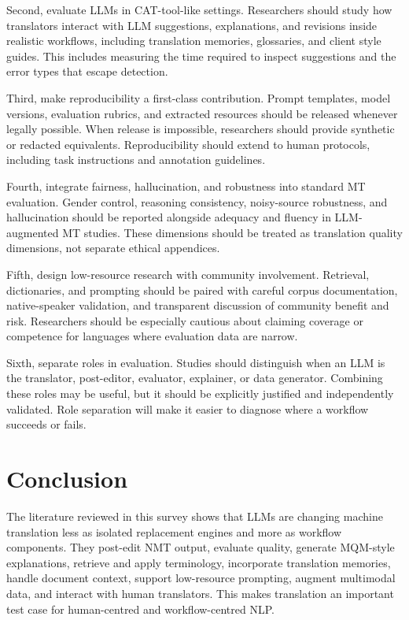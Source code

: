\documentclass[11pt]{article}
\begin{document}
Second, evaluate LLMs in CAT-tool-like settings. Researchers should study how translators interact with LLM suggestions, explanations, and revisions inside realistic workflows, including translation memories, glossaries, and client style guides. This includes measuring the time required to inspect suggestions and the error types that escape detection.

Third, make reproducibility a first-class contribution. Prompt templates, model versions, evaluation rubrics, and extracted resources should be released whenever legally possible. When release is impossible, researchers should provide synthetic or redacted equivalents. Reproducibility should extend to human protocols, including task instructions and annotation guidelines.

Fourth, integrate fairness, hallucination, and robustness into standard MT evaluation. Gender control, reasoning consistency, noisy-source robustness, and hallucination should be reported alongside adequacy and fluency in LLM-augmented MT studies. These dimensions should be treated as translation quality dimensions, not separate ethical appendices.

Fifth, design low-resource research with community involvement. Retrieval, dictionaries, and prompting should be paired with careful corpus documentation, native-speaker validation, and transparent discussion of community benefit and risk. Researchers should be especially cautious about claiming coverage or competence for languages where evaluation data are narrow.

Sixth, separate roles in evaluation. Studies should distinguish when an LLM is the translator, post-editor, evaluator, explainer, or data generator. Combining these roles may be useful, but it should be explicitly justified and independently validated. Role separation will make it easier to diagnose where a workflow succeeds or fails.

\section{Conclusion}
The literature reviewed in this survey shows that LLMs are changing machine translation less as isolated replacement engines and more as workflow components. They post-edit NMT output, evaluate quality, generate MQM-style explanations, retrieve and apply terminology, incorporate translation memories, handle document context, support low-resource prompting, augment multimodal data, and interact with human translators. This makes translation an important test case for human-centred and workflow-centred NLP.
\end{document}
